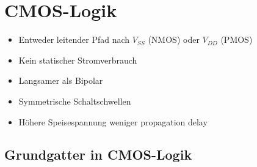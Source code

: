 \section{CMOS-Logik}

\begin{itemize}
    \item Entweder leitender Pfad nach $V_{SS}$ (NMOS) oder $V_{DD}$ (PMOS)
    \item Kein statischer Stromverbrauch
    \item Langsamer als Bipolar
    \item Symmetrische Schaltschwellen
    \item Höhere Speisespannung \textrightarrow weniger propagation delay
\end{itemize}


\subsection{Grundgatter in CMOS-Logik}

